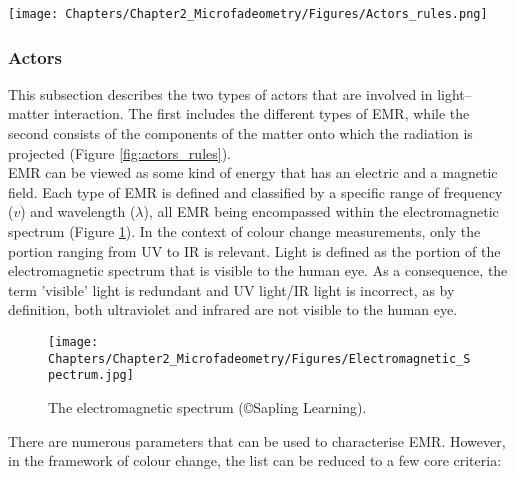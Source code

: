 \begin{figure*} %
\centering
\texttt{[image: Chapters/Chapter2\_Microfadeometry/Figures/Actors\_rules.png]}
\caption[\hspace{0.3cm}Actors and rules in play during colour change phenomena]{Actors and rules in play during colour change phenomena.}
\label{fig:actors_rules}
\end{figure*}

\subsubsection{Actors}

This subsection describes the two types of actors that are involved in light–matter interaction. The first includes the different types of \gls{EMR}, while the second consists of the components of the matter onto which the radiation is projected (Figure \ref{fig:actors_rules}). \\

\gls{EMR} can be viewed as some kind of energy that has an electric and a magnetic field. Each type of \gls{EMR} is defined and classified by a specific range of frequency ($v$) and wavelength ($\lambda$), all \gls{EMR} being encompassed within the electromagnetic spectrum (Figure \ref{fig:EM_spectrum}). In the context of colour change measurements, only the portion ranging from \gls{UV} to \gls{IR} is relevant. Light is defined as the portion of the electromagnetic spectrum that is visible to the human eye. As a consequence, the term 'visible' light is redundant and \gls{UV} light/\gls{IR} light is incorrect, as by definition, both ultraviolet and infrared are not visible to the human eye.\\

\begin{figure} %
\centering
\texttt{[image: Chapters/Chapter2\_Microfadeometry/Figures/Electromagnetic\_Spectrum.jpg]}
\caption[\hspace{0.3cm}The electromagnetic spectrum]{The electromagnetic spectrum (\copyright Sapling Learning).}
\label{fig:EM_spectrum}
\end{figure}

There are numerous parameters that can be used to characterise \gls{EMR}. However, in the framework of colour change, the list can be reduced to a few core criteria:

